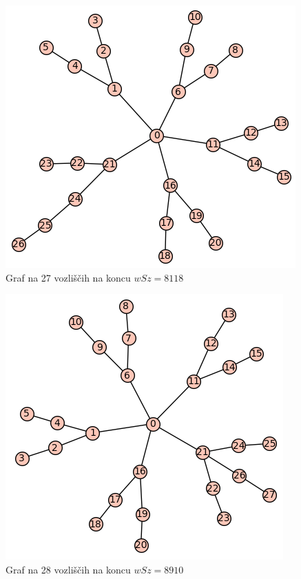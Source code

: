 \documentclass[12pt, a4paper]{article}
\begin{document}
\newpage

\begin{figure}[h]
\centering
\includegraphics[scale=0.4]{koncni_graf27}
\caption{Graf na 27 vozliščih na koncu $wSz = 8118$}
\end{figure}

\begin{figure}[h]
\centering
\includegraphics[scale=0.4]{koncni_graf28}
\caption{Graf na 28 vozliščih na koncu $wSz = 8910$}
\end{figure}
\end{document}
